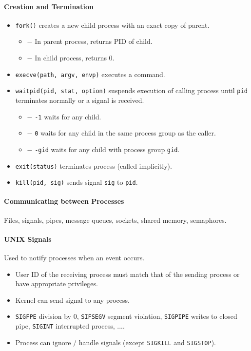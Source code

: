 \documentclass[twocolumn,english]{article}
\begin{document}
\paragraph{Creation and Termination}
\begin{itemize}
\item \texttt{fork()} creates a new child process with an exact copy of
parent. 
\begin{itemize}
\item $-$ In parent process, returns PID of child.
\item $-$ In child process, returns 0.
\end{itemize}
\item \texttt{execve(path, argv, envp)} executes a command.
\item \texttt{waitpid(pid, stat, option)} suspends execution of calling
process until \texttt{pid} terminates normally or a signal is received.
\begin{itemize}
\item $-$ \texttt{-1} waits for any child.
\item $-$ \texttt{0} waits for any child in the same process group as the
caller.
\item $-$ \texttt{-gid} waits for any child with process group \texttt{gid}.
\end{itemize}
\item \texttt{exit(status)} terminates process (called implicitly).
\item \texttt{kill(pid, sig)} sends signal \texttt{sig} to \texttt{pid}.
\end{itemize}

\paragraph{Communicating between Processes}

Files, signals, pipes, message queues, sockets, shared memory, semaphores.

\paragraph{UNIX Signals}

Used to notify processes when an event occurs.
\begin{itemize}
\item User ID of the receiving process must match that of the sending process
or have appropriate privileges.
\item Kernel can send signal to any process.
\item \texttt{SIGFPE} division by 0, \texttt{SIFSEGV} segment violation,
\texttt{SIGPIPE} writes to closed pipe, \texttt{SIGINT} interrupted
process, ....
\item Process can ignore / handle signals (except \texttt{SIGKILL} and \texttt{SIGSTOP}).
\end{itemize}
\end{document}
